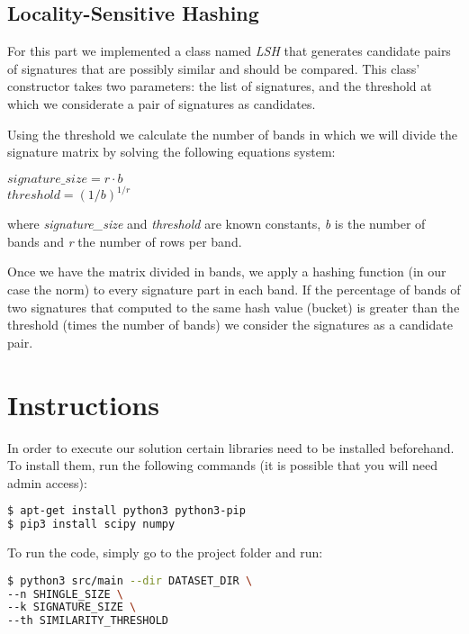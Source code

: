 \documentclass[12pt, a4paper]{article}
\begin{document}
\subsection{Locality-Sensitive Hashing}
For this part we implemented a class named \emph{LSH} that generates candidate pairs of signatures that are possibly similar and should be compared. This class' constructor takes two parameters: the list of signatures, and the threshold at which we considerate a pair of signatures as candidates.

Using the threshold we calculate the number of bands in which we will divide the signature matrix by solving the following equations system:
\begin{center}
$signature\_size = r \cdot b$ \\
$threshold = (1/b)^{1/r}$
\end{center}
where \emph{signature\_size} and \emph{threshold} are known constants, \emph{b} is the number of bands and \emph{r} the number of rows per band.

Once we have the matrix divided in bands, we apply a hashing function (in our case the norm) to every signature part in each band. If the percentage of bands of two signatures that computed to the same hash value (bucket) is greater than the threshold (times the number of bands) we consider the signatures as a candidate pair.

\section{Instructions}
In order to execute our solution certain libraries need to be installed beforehand. To install them, run the following commands (it is possible that you will need admin access):

\begin{lstlisting}[language=bash]
$ apt-get install python3 python3-pip
$ pip3 install scipy numpy
\end{lstlisting}

To run the code, simply go to the project folder and run:
\begin{lstlisting}[language=bash]
$ python3 src/main --dir DATASET_DIR \
--n SHINGLE_SIZE \
--k SIGNATURE_SIZE \
--th SIMILARITY_THRESHOLD
\end{lstlisting}
\end{document}
